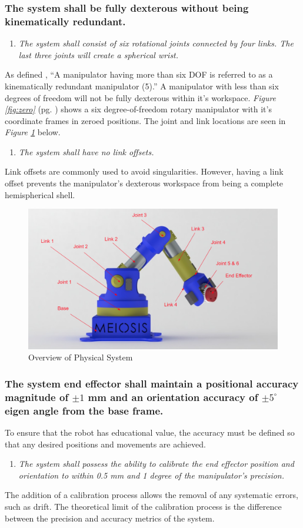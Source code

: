 \documentclass[12pt]{report}
\begin{document}
\subsubsection{The system shall be fully dexterous without being kinematically redundant.}
\begin{enumerate}
\item \textit{The system shall consist of six rotational joints connected by four links. The last three joints will create a spherical wrist.}
\end{enumerate}
As defined \cite{robo}, “A manipulator having more than six DOF is referred to as a kinematically redundant manipulator (5).” A manipulator with less than six degrees of freedom will not be fully dexterous within it's workspace. \emph{Figure \ref{fig:zero}} (pg. \pageref{fig:zero}) shows a six degree-of-freedom rotary manipulator with it's coordinate frames in zeroed positions. The joint and link locations are seen in \emph{Figure \ref{fig:model}} below.
\newpage
\begin{enumerate}[resume]
\item \textit{The system shall have no link offsets.}
\end{enumerate}
Link offsets are commonly used to avoid singularities. However, having a link offset prevents the manipulator's dexterous workspace from being a complete hemispherical shell.

\begin{figure}[htp]
  \centering
  \includegraphics[frame,width=.75\textwidth]{model}
  \caption{Overview of Physical System}
  \label{fig:model}
\end{figure}
\subsubsection{The system end effector shall maintain a positional accuracy magnitude of \(\pm 1\) mm and an orientation accuracy of \(\pm 5^{\circ}\) eigen angle from the base frame.}
To ensure that the robot has educational value, the accuracy must be defined so that any desired positions and movements are achieved.
\begin{enumerate}
  \item \textit{The system shall possess the ability to calibrate the end effector position and orientation to within 0.5 mm and 1 degree of the manipulator’s precision.}
\end{enumerate}
The addition of a calibration process allows the removal of any systematic errors, such as drift. The theoretical limit of the calibration process is the difference between the precision and accuracy metrics of the system.
\end{document}
